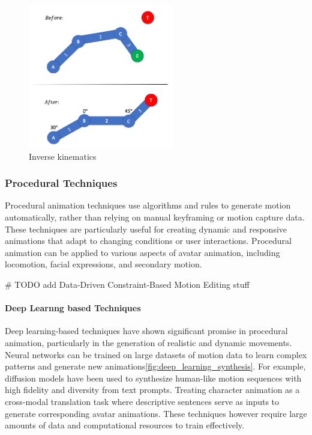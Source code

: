 \documentclass[../../main.tex]{subfiles}
\begin{document}
\begin{figure}
  \centering \includegraphics[width = 2.5in]{chapters/background_work/images/inverse_kinematics_example.png}
  \caption{Inverse kinematics}
  \label{fig:inverse_kinematics_example}
\end{figure}

\subsubsection{Procedural Techniques}

Procedural animation techniques use algorithms and rules to generate motion automatically, rather than relying on manual keyframing or motion capture data. These techniques are particularly useful for creating dynamic and responsive animations that adapt to changing conditions or user interactions. Procedural animation can be applied to various aspects of avatar animation, including locomotion, facial expressions, and secondary motion.

# TODO add Data-Driven Constraint-Based Motion Editing stuff

\paragraph{Deep Learnng based Techniques}

Deep learning-based techniques have shown significant promise in procedural animation, particularly in the generation of realistic and dynamic movements. Neural networks can be trained on large datasets of motion data to learn complex patterns and generate new animations\ref{fig:deep_learning_synthesis}. For example, diffusion models\cite{TODO} have been used to synthesize human-like motion sequences with high fidelity and diversity from text prompts. Treating character animation as a cross-modal translation task where descriptive sentences serve as inputs to generate corresponding avatar animations. These techniques however require large amounts of data and computational resources to train effectively.
\end{document}
